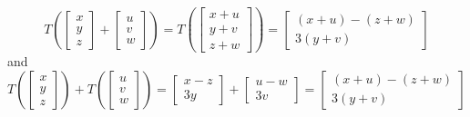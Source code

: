 \documentclass{article}
\begin{document}
\begin{equation*}
T\left(
\left[\begin{array}{c} x \\ y \\ z \end{array}\right] +
\left[\begin{array}{c} u \\ v \\ w \end{array}\right]
\right)
=
T\left(
\left[\begin{array}{c} x+u \\ y+v \\ z+w \end{array}\right]
\right) =
\left[\begin{array}{c} (x+u)-(z+w) \\ 3(y+v) \end{array}\right]
\end{equation*} and \\
\begin{equation*}
T\left(
\left[\begin{array}{c} x \\ y \\ z \end{array}\right]
\right) + T\left(
\left[\begin{array}{c} u \\ v \\ w \end{array}\right]
\right)
=
\left[\begin{array}{c} x-z \\ 3y \end{array}\right] +
\left[\begin{array}{c} u-w \\ 3v \end{array}\right]=
\left[\begin{array}{c} (x+u)-(z+w) \\ 3(y+v) \end{array}\right]
\end{equation*}\\
\end{document}
